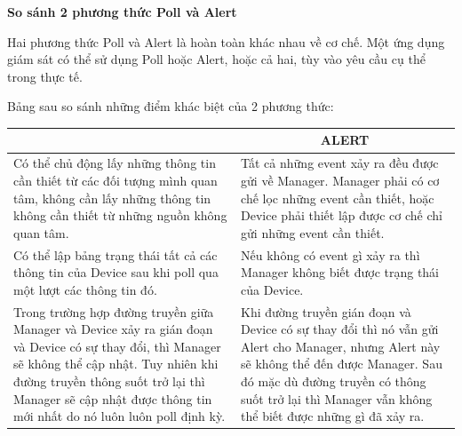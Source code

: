 \documentclass[12pt,oneside,a4paper,reqno]{report}
\begin{document}
\begin{large}
\textbf{So sánh 2 phương thức Poll và Alert}

Hai phương thức Poll và Alert là hoàn toàn khác nhau về cơ chế. Một ứng dụng giám sát có thể sử dụng Poll hoặc Alert, hoặc cả hai, tùy vào yêu cầu cụ thể trong thực tế.

Bảng sau so sánh những điểm khác biệt của 2 phương thức:
\newpage
\begin{longtable}{|p{8cm}|p{8cm}|}
\hline
\rowcolor[HTML]{EFEFEF} 
\multicolumn{1}{|c|}{\cellcolor[HTML]{EFEFEF}\textbf{POLL}}                                                                                                                                                                                                    & \multicolumn{1}{c|}{\cellcolor[HTML]{EFEFEF}\textbf{ALERT}}                                                                                                                                                                                   \\ \hline
Có thể chủ động lấy những thông tin cần thiết từ các đối tượng mình quan tâm, không cần lấy những thông tin không cần thiết từ những nguồn không quan tâm.                                                                                                     & Tất cả những event xảy ra đều được gửi về Manager. Manager phải có cơ chế lọc những event cần thiết, hoặc Device phải thiết lập được cơ chế chỉ gửi những event cần thiết.                                                                    \\ \hline
Có thể lập bảng trạng thái tất cả các thông tin của Device sau khi poll qua một lượt các thông tin đó.                                                                                                                                                         & Nếu không có event gì xảy ra thì Manager không biết được trạng thái của Device.                                                                                                                                                               \\ \hline
Trong trường hợp đường truyền giữa Manager và Device xảy ra gián đoạn và Device có sự thay đổi, thì Manager sẽ không thể cập nhật. Tuy nhiên khi đường truyền thông suốt trở lại thì Manager sẽ cập nhật được thông tin mới nhất do nó luôn luôn poll định kỳ. & Khi đường truyền gián đoạn và Device có sự thay đổi thì nó vẫn gửi Alert cho Manager, nhưng Alert này sẽ không thể đến được Manager. Sau đó mặc dù đường truyền có thông suốt trở lại thì Manager vẫn không thể biết được những gì đã xảy ra. \\ \hline

\end{longtable}
\end{large}
\end{document}
